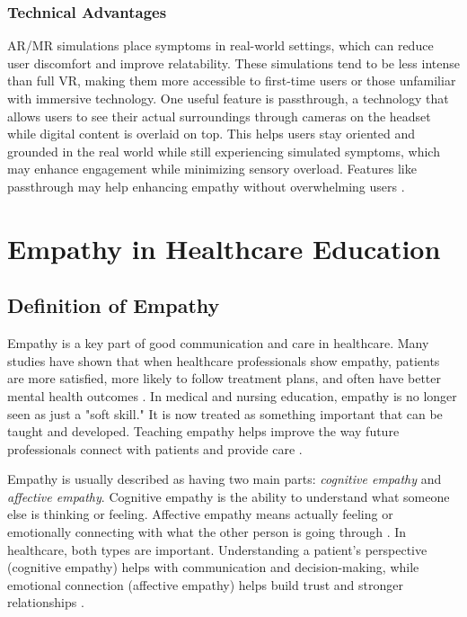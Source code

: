 \subsubsection{Technical Advantages}

AR/MR simulations place symptoms in real-world settings, which can reduce user discomfort and improve relatability. These simulations tend to be less intense than full VR, making them more accessible to first-time users or those unfamiliar with immersive technology. One useful feature is passthrough, a technology that allows users to see their actual surroundings through cameras on the headset while digital content is overlaid on top. This helps users stay oriented and grounded in the real world while still experiencing simulated symptoms, which may enhance engagement while minimizing sensory overload. Features like passthrough may help enhancing empathy without overwhelming users \cite{Krogmeier2024, Silva2017, Lan2023}.

\section{Empathy in Healthcare Education}

\subsection{Definition of Empathy}
Empathy is a key part of good communication and care in healthcare. Many studies have shown that when healthcare professionals show empathy, patients are more satisfied, more likely to follow treatment plans, and often have better mental health outcomes \cite{Cunico2012, Olson1995, Ozcan2018}. In medical and nursing education, empathy is no longer seen as just a "soft skill." It is now treated as something important that can be taught and developed. Teaching empathy helps improve the way future professionals connect with patients and provide care \cite{Cunico2012}.

Empathy is usually described as having two main parts: \textit{cognitive empathy} and \textit{affective empathy}. Cognitive empathy is the ability to understand what someone else is thinking or feeling. Affective empathy means actually feeling or emotionally connecting with what the other person is going through \cite{Ventura2020, Martingano2021}. In healthcare, both types are important. Understanding a patient's perspective (cognitive empathy) helps with communication and decision-making, while emotional connection (affective empathy) helps build trust and stronger relationships \cite{Cunico2012, Ozcan2018}. 


